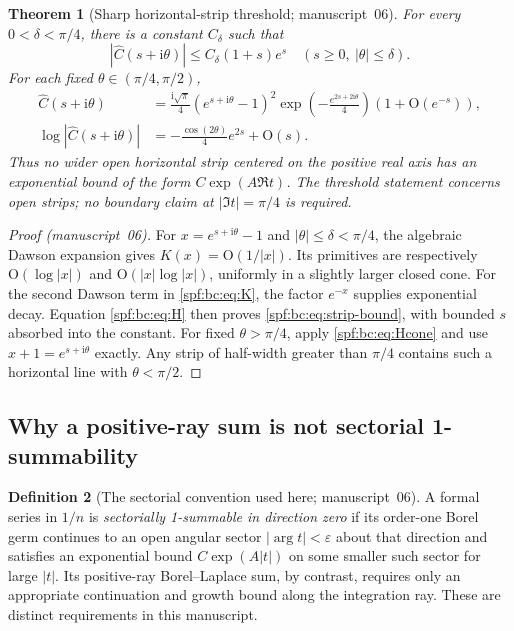 \documentclass[11pt]{article}
\numberwithin{equation}{section}
\newtheorem{theorem}{Theorem}[section]
\theoremstyle{definition}
\newtheorem{definition}[theorem]{Definition}
\theoremstyle{remark}
\theoremstyle{definition}
\newcommand{\bigO}{\mathrm O}
\begin{document}
\begin{theorem}[Sharp horizontal-strip threshold; manuscript~06]
\label{spf:bc:thm:strip}
For every $0<\delta<\pi/4$, there is a constant $C_\delta$ such that
\begin{equation}
 |\widehat C(s+\mathrm i\theta)|\le C_\delta(1+s)e^s
 \quad(s\ge0,\ |\theta|\le\delta).
 \label{spf:bc:eq:strip-bound}
\end{equation}
For each fixed $\theta\in(\pi/4,\pi/2)$,
\begin{align}
 \widehat C(s+\mathrm i\theta)
 &=\frac{\mathrm i\sqrt\pi}{4}(e^{s+\mathrm i\theta}-1)^2
    \exp\!\left(-\frac{e^{2s+2\mathrm i\theta}}4\right)
                      (1+\bigO(e^{-s})),\label{spf:bc:eq:strip-outside}\\
 \log|\widehat C(s+\mathrm i\theta)|
 &=-\frac{\cos(2\theta)}4e^{2s}+\bigO(s).
 \label{spf:bc:eq:strip-outside-log}
\end{align}
Thus no wider open horizontal strip centered on the positive real axis has
an exponential bound of the form $C\exp(A\Re t)$. The threshold statement
concerns open strips; no boundary claim at $|\Im t|=\pi/4$ is required.
\end{theorem}
\begin{proof}[Proof (manuscript~06)]
For $x=e^{s+\mathrm i\theta}-1$ and $|\theta|\le\delta<\pi/4$, the algebraic
Dawson expansion gives $K(x)=\bigO(1/|x|)$. Its primitives are respectively
$\bigO(\log|x|)$ and $\bigO(|x|\log|x|)$, uniformly in a slightly larger
closed cone. For the second Dawson term in \eqref{spf:bc:eq:K}, the factor
$e^{-x}$ supplies exponential decay. Equation \eqref{spf:bc:eq:H} then proves
\eqref{spf:bc:eq:strip-bound}, with bounded $s$ absorbed into the constant.
For fixed $\theta>\pi/4$, apply \eqref{spf:bc:eq:Hcone} and use
$x+1=e^{s+\mathrm i\theta}$ exactly. Any strip of half-width greater than
$\pi/4$ contains such a horizontal line with $\theta<\pi/2$.
\end{proof}

\subsection{Why a positive-ray sum is not sectorial 1-summability}

\begin{definition}[The sectorial convention used here; manuscript~06]
A formal series in $1/n$ is \emph{sectorially 1-summable in direction zero}
if its order-one Borel germ continues to an open angular sector
$|\arg t|<\varepsilon$ about that direction and satisfies an exponential
bound $C\exp(A|t|)$ on some smaller such sector for large $|t|$.
Its positive-ray Borel--Laplace sum, by contrast, requires only an appropriate
continuation and growth bound along the integration ray. These are distinct
requirements in this manuscript.
\end{definition}
\end{document}
